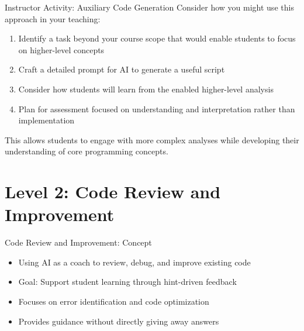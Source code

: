 \documentclass[xcolor={dvipsnames}, aspectratio=169]{beamer}
\begin{document}
\begin{frame}{Instructor Activity: Auxiliary Code Generation}
  Consider how you might use this approach in your teaching:
  
  \begin{enumerate}
    \item Identify a task beyond your course scope that would enable students to focus on higher-level concepts
    \item Craft a detailed prompt for AI to generate a useful script
    \item Consider how students will learn from the enabled higher-level analysis
    \item Plan for assessment focused on understanding and interpretation rather than implementation
  \end{enumerate}
  
  This allows students to engage with more complex analyses while developing their understanding of core programming concepts.
\end{frame}

\section{Level 2: Code Review and Improvement}

\begin{frame}{Code Review and Improvement: Concept}
  \begin{itemize}
    \item Using AI as a coach to review, debug, and improve existing code
    \item Goal: Support student learning through hint-driven feedback
    \item Focuses on error identification and code optimization
    \item Provides guidance without directly giving away answers
  \end{itemize}
\end{frame}
\end{document}

